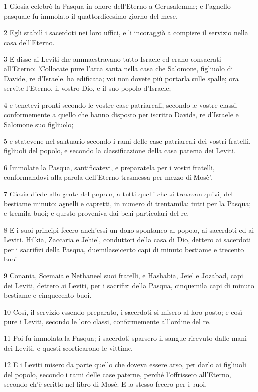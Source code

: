 \par 1 Giosia celebrò la Pasqua in onore dell'Eterno a Gerusalemme; e l'agnello pasquale fu immolato il quattordicesimo giorno del mese.
\par 2 Egli stabilì i sacerdoti nei loro uffici, e li incoraggiò a compiere il servizio nella casa dell'Eterno.
\par 3 E disse ai Leviti che ammaestravano tutto Israele ed erano consacrati all'Eterno: 'Collocate pure l'arca santa nella casa che Salomone, figliuolo di Davide, re d'Israele, ha edificata; voi non dovete più portarla sulle spalle; ora servite l'Eterno, il vostro Dio, e il suo popolo d'Israele;
\par 4 e tenetevi pronti secondo le vostre case patriarcali, secondo le vostre classi, conformemente a quello che hanno disposto per iscritto Davide, re d'Israele e Salomone suo figliuolo;
\par 5 e statevene nel santuario secondo i rami delle case patriarcali dei vostri fratelli, figliuoli del popolo, e secondo la classificazione della casa paterna dei Leviti.
\par 6 Immolate la Pasqua, santificatevi, e preparatela per i vostri fratelli, conformandovi alla parola dell'Eterno trasmessa per mezzo di Mosè'.
\par 7 Giosia diede alla gente del popolo, a tutti quelli che si trovavan quivi, del bestiame minuto: agnelli e capretti, in numero di trentamila: tutti per la Pasqua; e tremila buoi; e questo proveniva dai beni particolari del re.
\par 8 E i suoi principi fecero anch'essi un dono spontaneo al popolo, ai sacerdoti ed ai Leviti. Hilkia, Zaccaria e Jehiel, conduttori della casa di Dio, dettero ai sacerdoti per i sacrifizi della Pasqua, duemilaseicento capi di minuto bestiame e trecento buoi.
\par 9 Conania, Scemaia e Nethaneel suoi fratelli, e Hashabia, Jeiel e Jozabad, capi dei Leviti, dettero ai Leviti, per i sacrifizi della Pasqua, cinquemila capi di minuto bestiame e cinquecento buoi.
\par 10 Così, il servizio essendo preparato, i sacerdoti si misero al loro posto; e così pure i Leviti, secondo le loro classi, conformemente all'ordine del re.
\par 11 Poi fu immolata la Pasqua; i sacerdoti sparsero il sangue ricevuto dalle mani dei Leviti, e questi scorticarono le vittime.
\par 12 E i Leviti misero da parte quello che doveva essere arso, per darlo ai figliuoli del popolo, secondo i rami delle case paterne, perché l'offrissero all'Eterno, secondo ch'è scritto nel libro di Mosè. E lo stesso fecero per i buoi.
